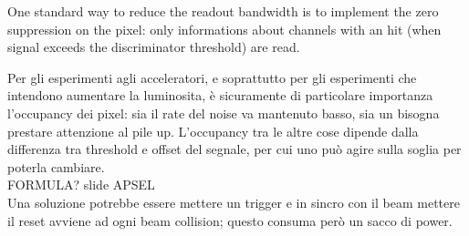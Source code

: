 One standard way to reduce the readout bandwidth is to implement the zero suppression
on the pixel: only informations about channels with an hit (when signal exceeds
the discriminator threshold) are read.

Per gli esperimenti agli acceleratori, e soprattutto per gli esperimenti che
intendono aumentare la luminosita, è sicuramente di particolare importanza
l'occupancy dei pixel: sia il rate del noise va mantenuto basso, sia un
bisogna prestare attenzione al pile up.
L'occupancy tra le altre cose dipende dalla differenza tra threshold e offset del
segnale, per cui uno può agire sulla soglia per poterla cambiare.\\
FORMULA? slide APSEL\\
Una soluzione potrebbe essere mettere un trigger e in sincro con il beam mettere
il reset avviene ad ogni beam collision; questo consuma però un sacco di power. \\

